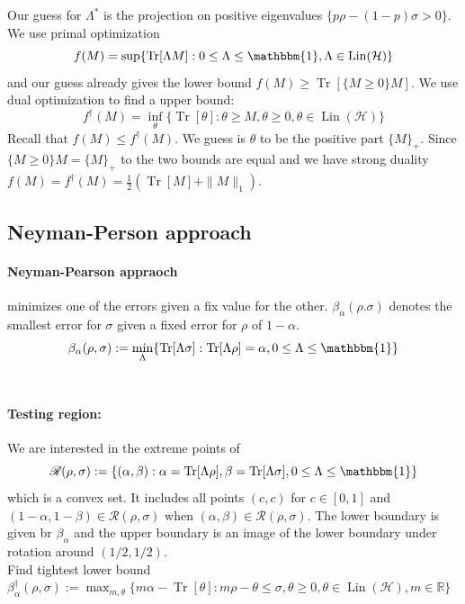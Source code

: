 Our guess for $\Lambda^*$ is the projection on positive eigenvalues $\{p \rho-(1-p) \sigma>0\}$. We use primal optimization 
$$f(M)=\sup \{\operatorname{Tr}[\Lambda M]: 0 \leq \Lambda \leq \mathbbm{1}, \Lambda \in \operatorname{Lin}(\mathcal{H})\}$$
and our guess already gives the lower bound $f(M) \geq \operatorname{Tr}[\{M \geq 0\} M]$. We use dual optimization to find a upper
bound: $$f^{\dagger}(M)=\inf _\theta\{\operatorname{Tr}[\theta]: \theta \geq M, \theta \geq 0, \theta \in \operatorname{Lin}(\mathcal{H})\}$$
Recall that $f(M) \leq f^{\dagger}(M)$. We guess is $\theta$ to be the positive part $\{M\}_+$. Since $\{M \geq 0\} M=\{M\}_{+}$
to the two bounds are equal and we have strong duality $f(M)=f^{\dagger}(M)=\frac{1}{2}\left(\operatorname{Tr}[M]+\|M\|_1\right)$.

\subsection{Neyman-Person approach}

\paragraph{Neyman-Pearson appraoch} minimizes one of the errors given a fix value for the other. $\beta_\alpha(\rho.\sigma)$ denotes the 
smallest error for $\sigma$ given a fixed error for $\rho$ of $1-\alpha$.
$$\beta_\alpha(\rho, \sigma):=\min _{\Lambda}\{\operatorname{Tr}[\Lambda \sigma]: \operatorname{Tr}[\Lambda \rho]=\alpha, 0 \leq \Lambda \leq \mathbbm{1}\}$$\\

\paragraph{Testing region:} We are interested in the extreme points of $$\mathscr{R}(\rho, \sigma):=\{(\alpha, \beta): \alpha=\operatorname{Tr}[\Lambda \rho], \beta=\operatorname{Tr}[\Lambda \sigma], 0 \leq \Lambda \leq \mathbbm{1}\}$$
which is a convex set. It includes all points $(c,c)$ for $c \in [0,1]$ and $(1-\alpha, 1-\beta) \in \mathscr{R}(\rho, \sigma)$ when $(\alpha, \beta) \in \mathscr{R}(\rho, \sigma)$.
The lower boundary is given br $\beta_\alpha$ and the upper boundary is an image of the lower boundary under rotation around $(1/2,1/2)$.\\

Find tightest lower bound $\beta_\alpha^{\dagger}(\rho, \sigma):=\max _{m, \theta}\{m \alpha-\operatorname{Tr}[\theta]: m \rho-\theta \leq \sigma, \theta \geq 0, \theta \in \operatorname{Lin}(\mathcal{H}), m \in \mathbb{R}\}$

